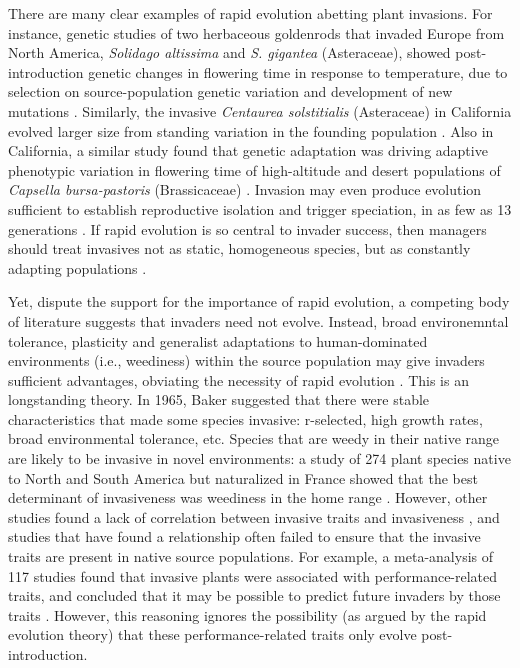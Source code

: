 \documentclass[12pt]{article}\usepackage[]{graphicx}\usepackage[]{color}
\begin{document}
	There are many clear examples of rapid evolution abetting plant invasions. For instance, genetic studies of two herbaceous goldenrods that invaded Europe from North America, \textit{Solidago altissima} and \textit{S. gigantea} (Asteraceae), showed post-introduction genetic changes in flowering time in response to temperature, due to selection on source-population genetic variation and development of new mutations \parencite{Weber1998}. Similarly, the invasive \textit{Centaurea solstitialis} (Asteraceae) in California evolved larger size from standing variation in the founding population \parencite{Barker2017}. Also in California, a similar study found that genetic adaptation was driving adaptive phenotypic variation in flowering time of high-altitude and desert populations of \textit{Capsella bursa-pastoris} (Brassicaceae) \parencite{Linde2001}. Invasion may even produce evolution sufficient to establish reproductive isolation and trigger speciation, in as few as 13 generations \parencite{Hendry2000}. If rapid evolution is so central to invader success, then managers should treat invasives not as static, homogeneous species, but as constantly adapting populations \parencite{Lee2002invasion}. 
	
	Yet, dispute the support for the importance of rapid evolution, a competing body of literature suggests that invaders need not evolve. Instead,  broad environemntal tolerance, plasticity and generalist adaptations to human-dominated environments (i.e., weediness) within the source population may give invaders sufficient advantages, obviating the necessity of rapid evolution \parencite{Richards2006,Schwartz1994,Bock2015,Rejmanek1996}. This is an longstanding theory. In 1965, Baker suggested that there were stable characteristics that made some species invasive: r-selected, high growth rates, broad environmental tolerance, etc. Species that are weedy in their native range are likely to be invasive in novel environments: a study of 274 plant species native to North and South America but naturalized in France showed that the best determinant of invasiveness was weediness in the home range \parencite{Maillet2000}. However, other studies found a lack of correlation between invasive traits and invasiveness \parencite{Perrins1992,Mack1996}, and studies that have found a relationship often failed to ensure that the invasive traits are present in native source populations. For example, a meta-analysis of 117 studies found that invasive plants were associated with performance-related traits, and concluded that it may be possible to predict future invaders by those traits \parencite{VanKleunen2010}. However, this reasoning ignores the possibility (as argued by the rapid evolution theory) that these performance-related traits only evolve post-introduction.  
	
\end{document}
